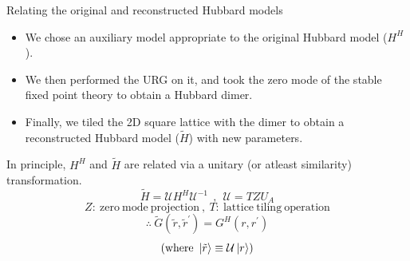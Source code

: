 \documentclass[aspectratio=169]{beamer}
\begin{document}
\begin{frame}{Relating the original and reconstructed Hubbard models}
\begin{itemize}
\item We chose an auxiliary model appropriate to the original Hubbard model ($H^{H}$).
\item We then performed the URG on it, and took the zero mode of the stable fixed point theory to obtain a Hubbard dimer. 
\item Finally, we tiled the 2D square lattice with the dimer to obtain a reconstructed Hubbard model ($\tilde{H}$) with new parameters. 
\end{itemize}
In principle, $H^{H}$ and $\tilde{H}$ are related via a unitary (or atleast similarity) transformation.
\[\tilde H = \mathcal{U}H^H\mathcal{U}^{-1}~~,~~ \mathcal{U} = T Z U_{A}\]
\[Z:~\mathrm{zero~mode~projection}~,~ T:~\mathrm{lattice~tiling~operation}\] 
\[\therefore~\tilde G (\tilde r,\tilde r^\prime) = G^H ( r, r^\prime)\]
\[\left(\text{where }\ket{\tilde r} \equiv \mathcal{U}\ket{r}\right)\]
\end{frame}
\end{document}
